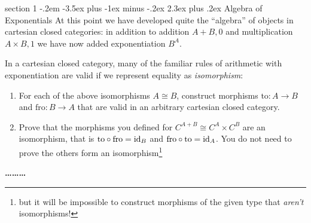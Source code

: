 \documentclass[12pt]{article}
\makeatletter
\newenvironment{problem}{\@startsection
       {section}
       {1}
       {-.2em}
       {-3.5ex plus -1ex minus -.2ex}
       {2.3ex plus .2ex}
       {\pagebreak[3]%
       \large\bf\noindent{Problem }
       }
       }
       {%
       \begin{center}\large\bf \ldots\ldots\ldots\end{center}}
\makeatother
\begin{document}
\begin{problem}{Algebra of Exponentials}
  At this point we have developed quite the ``algebra'' of objects in
  cartesian closed categories: in addition to addition $A + B, 0$ and
  multiplication $A \times B, 1$ we have now added exponentiation
  $B^A$.

  In a cartesian closed category, many of the familiar rules of
  arithmetic with exponentiation are valid if we represent equality as
  \emph{isomorphism}:

  \begin{enumerate}
  \item For each of the above isomorphisms $A \cong B$, construct
    morphisms $\textrm{to}:A \to B$ and $\textrm{fro}:B \to A$ that are valid in an arbitrary
    cartesian closed category.
  \item Prove that the morphisms you defined for $C^{A+B} \cong C^A
    \times C^B$ are an isomorphism, that is $\textrm{to} \circ
    \textrm{fro} = \textrm{id}_B$ and $\textrm{fro} \circ \textrm{to} =
    \textrm{id}_A$. You do not need to prove the others form an
    isomorphism\footnote{but it will be impossible to construct
    morphisms of the given type that \emph{aren't} isomorphisms!}
  \end{enumerate}
\end{problem}
\end{document}
